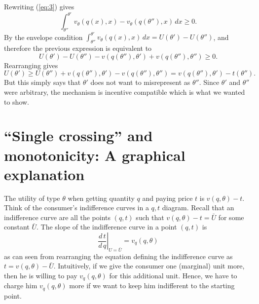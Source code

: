 \documentclass[12pt]{article}
\begin{document}
Rewriting (\ref{eq:3}) gives
\begin{equation*}
  \int_{\theta ''}^{\theta '}v_{\theta }(q(x),x)-v_{\theta }(q(\theta ''), x)\,dx\geq 0.
\end{equation*}
By the envelope condition $\int_{\theta ''}^{\theta '}v_{\theta }(q(x),x)\,dx=U(\theta ')-U(\theta '')$, and therefore the previous expression is equivalent to
\begin{equation*}
  U(\theta ')-U(\theta '')-v(q(\theta ''),\theta ')+v(q(\theta ''),\theta '')\geq 0.
\end{equation*}
Rearranging gives 
\begin{equation*}
  U(\theta ')\geq U(\theta '')+v(q(\theta ''),\theta ')-v(q(\theta ''),\theta '')=v(q(\theta ''),\theta ')-t(\theta '').
\end{equation*}
But this simply says that $\theta '$ does not want to misrepresent as $\theta ''$. Since $\theta '$ and $\theta ''$ were arbitrary, the mechanism is incentive compatible which is what we wanted to show.

\section{ ``Single crossing'' and monotonicity: A graphical explanation}

The utility of type $\theta $ when getting quantity $q$ and paying price $t$ is $v(q,\theta )-t$. Think of the consumer's indifference curves in a $q,t$ diagram. Recall that an indifference curve are all the points $(q,t)$ such that $v(q,\theta )-t=\bar{U}$ for some constant $\bar{U}$. The slope of the indifference curve in a point $(q,t)$ is 
\begin{equation*}
  \left.\frac{d\,t}{d\,q}\right|_{U=\bar{U}}=v_q(q,\theta )
\end{equation*}
as can seen from rearranging the equation defining the indifference curve as $t=v(q,\theta )-\bar{U}$.
Intuitively, if we give the consumer one (marginal) unit more, then he is willing to pay $v_q(q,\theta )$ for this additional unit. Hence, we have to charge him $v_q(q,\theta )$ more if we want to keep him indifferent to the starting point.
\end{document}
